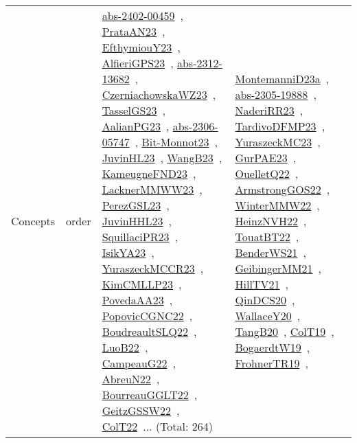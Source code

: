 {\begin{longtable}{lp{3cm}>{\raggedright\arraybackslash}p{6cm}>{\raggedright\arraybackslash}p{6cm}>{\raggedright\arraybackslash}p{8cm}}
Concepts & order & \href{articles/abs-2402-00459.pdf}{abs-2402-00459}~\cite{abs-2402-00459}, \href{articles/PrataAN23.pdf}{PrataAN23}~\cite{PrataAN23}, \href{papers/EfthymiouY23.pdf}{EfthymiouY23}~\cite{EfthymiouY23}, \href{articles/AlfieriGPS23.pdf}{AlfieriGPS23}~\cite{AlfieriGPS23}, \href{articles/abs-2312-13682.pdf}{abs-2312-13682}~\cite{abs-2312-13682}, \href{articles/CzerniachowskaWZ23.pdf}{CzerniachowskaWZ23}~\cite{CzerniachowskaWZ23}, \href{papers/TasselGS23.pdf}{TasselGS23}~\cite{TasselGS23}, \href{papers/AalianPG23.pdf}{AalianPG23}~\cite{AalianPG23}, \href{articles/abs-2306-05747.pdf}{abs-2306-05747}~\cite{abs-2306-05747}, \href{papers/Bit-Monnot23.pdf}{Bit-Monnot23}~\cite{Bit-Monnot23}, \href{papers/JuvinHL23.pdf}{JuvinHL23}~\cite{JuvinHL23}, \href{papers/WangB23.pdf}{WangB23}~\cite{WangB23}, \href{papers/KameugneFND23.pdf}{KameugneFND23}~\cite{KameugneFND23}, \href{articles/LacknerMMWW23.pdf}{LacknerMMWW23}~\cite{LacknerMMWW23}, \href{papers/PerezGSL23.pdf}{PerezGSL23}~\cite{PerezGSL23}, \href{papers/JuvinHHL23.pdf}{JuvinHHL23}~\cite{JuvinHHL23}, \href{papers/SquillaciPR23.pdf}{SquillaciPR23}~\cite{SquillaciPR23}, \href{articles/IsikYA23.pdf}{IsikYA23}~\cite{IsikYA23}, \href{articles/YuraszeckMCCR23.pdf}{YuraszeckMCCR23}~\cite{YuraszeckMCCR23}, \href{papers/KimCMLLP23.pdf}{KimCMLLP23}~\cite{KimCMLLP23}, \href{papers/PovedaAA23.pdf}{PovedaAA23}~\cite{PovedaAA23}, \href{papers/PopovicCGNC22.pdf}{PopovicCGNC22}~\cite{PopovicCGNC22}, \href{papers/BoudreaultSLQ22.pdf}{BoudreaultSLQ22}~\cite{BoudreaultSLQ22}, \href{papers/LuoB22.pdf}{LuoB22}~\cite{LuoB22}, \href{articles/CampeauG22.pdf}{CampeauG22}~\cite{CampeauG22}, \href{articles/AbreuN22.pdf}{AbreuN22}~\cite{AbreuN22}, \href{articles/BourreauGGLT22.pdf}{BourreauGGLT22}~\cite{BourreauGGLT22}, \href{papers/GeitzGSSW22.pdf}{GeitzGSSW22}~\cite{GeitzGSSW22}, \href{articles/ColT22.pdf}{ColT22}~\cite{ColT22}... (Total: 264) & \href{articles/MontemanniD23a.pdf}{MontemanniD23a}~\cite{MontemanniD23a}, \href{articles/abs-2305-19888.pdf}{abs-2305-19888}~\cite{abs-2305-19888}, \href{articles/NaderiRR23.pdf}{NaderiRR23}~\cite{NaderiRR23}, \href{papers/TardivoDFMP23.pdf}{TardivoDFMP23}~\cite{TardivoDFMP23}, \href{papers/YuraszeckMC23.pdf}{YuraszeckMC23}~\cite{YuraszeckMC23}, \href{articles/GurPAE23.pdf}{GurPAE23}~\cite{GurPAE23}, \href{papers/OuelletQ22.pdf}{OuelletQ22}~\cite{OuelletQ22}, \href{papers/ArmstrongGOS22.pdf}{ArmstrongGOS22}~\cite{ArmstrongGOS22}, \href{papers/WinterMMW22.pdf}{WinterMMW22}~\cite{WinterMMW22}, \href{articles/HeinzNVH22.pdf}{HeinzNVH22}~\cite{HeinzNVH22}, \href{papers/TouatBT22.pdf}{TouatBT22}~\cite{TouatBT22}, \href{papers/BenderWS21.pdf}{BenderWS21}~\cite{BenderWS21}, \href{papers/GeibingerMM21.pdf}{GeibingerMM21}~\cite{GeibingerMM21}, \href{papers/HillTV21.pdf}{HillTV21}~\cite{HillTV21}, \href{articles/QinDCS20.pdf}{QinDCS20}~\cite{QinDCS20}, \href{articles/WallaceY20.pdf}{WallaceY20}~\cite{WallaceY20}, \href{papers/TangB20.pdf}{TangB20}~\cite{TangB20}, \href{papers/ColT19.pdf}{ColT19}~\cite{ColT19}, \href{papers/BogaerdtW19.pdf}{BogaerdtW19}~\cite{BogaerdtW19}, \href{papers/FrohnerTR19.pdf}{FrohnerTR19}~\cite{FrohnerTR19}, 
\end{longtable}}
